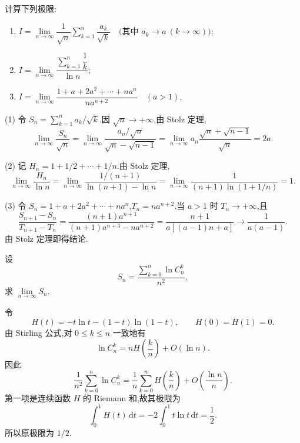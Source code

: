 \begin{example}
  计算下列极限:
  \begin{enumerate}
    \item $\displaystyle
            I=\lim\limits_{n\to\infty}\dfrac{1}{\sqrt n}\sum\limits_{k=1}^n\dfrac{a_k}{\sqrt k}
            \quad\text{(其中 }a_k\to a\ (k\to\infty)\text{)}$;
    \item $\displaystyle
            I=\lim\limits_{n\to\infty}\dfrac{\sum\limits_{k=1}^n\dfrac{1}{k}}{\ln n}$;
    \item $\displaystyle
            I=\lim\limits_{n\to\infty}\dfrac{1+a+2a^2+\cdots+na^n}{na^{n+2}}
            \quad(a>1)$.
  \end{enumerate}
\end{example}
\exampleblank

\begin{solution}
  (1) 令 $S_n=\displaystyle \sum\limits_{k=1}^n a_k/\sqrt k$.因 $\sqrt n\to+\infty$,由 Stolz 定理,
  \[
    \lim\limits_{n\to\infty}\dfrac{S_n}{\sqrt n}
    =\lim\limits_{n\to\infty}
    \dfrac{a_n/\sqrt n}{\sqrt n-\sqrt{n-1}}
    =\lim\limits_{n\to\infty}a_n\dfrac{\sqrt n+\sqrt{n-1}}{\sqrt n}=2a.
  \]

  (2) 记 $H_n=1+1/2+\cdots+1/n$.由 Stolz 定理,
  \[
    \lim\limits_{n\to\infty}\dfrac{H_n}{\ln n}
    =\lim\limits_{n\to\infty}
    \dfrac{1/(n+1)}{\ln(n+1)-\ln n}
    =\lim\limits_{n\to\infty}\dfrac{1}{(n+1)\ln(1+1/n)}=1.
  \]

  (3) 令 $S_n=1+a+2a^2+\cdots+na^n$,$T_n=na^{n+2}$.当 $a>1$ 时
  $T_n\to+\infty$,且
  \[
    \dfrac{S_{n+1}-S_n}{T_{n+1}-T_n}
    =\dfrac{(n+1)a^{n+1}}{(n+1)a^{n+3}-na^{n+2}}
    =\dfrac{n+1}{a[(a-1)n+a]}
    \longrightarrow\dfrac{1}{a(a-1)}.
  \]
  由 Stolz 定理即得结论.
\end{solution}

\begin{example}
  设
  \[
    S_n=\dfrac{\sum\limits_{k=0}^n\ln C_{n}^{k}}{n^2},
  \]
  求 $\displaystyle \lim\limits_{n\to\infty}S_n$.
\end{example}
\exampleblank

\begin{solution}
  令
  \[
    H(t)=-t\ln t-(1-t)\ln(1-t),
    \qquad H(0)=H(1)=0.
  \]
  由 Stirling 公式,对 $0\leq k\leq n$ 一致地有
  \[
    \ln C_n^k=nH\left(\dfrac{k}{n}\right)+O(\ln n).
  \]
  因此
  \[
    \dfrac{1}{n^2}\sum\limits_{k=0}^n\ln C_n^k
    =\dfrac{1}{n}\sum\limits_{k=0}^n H\left(\dfrac{k}{n}\right)
    +O\left(\dfrac{\ln n}{n}\right).
  \]
  第一项是连续函数 $H$ 的 Riemann 和,故其极限为
  \[
    \int_0^1H(t)\,\mathrm{d}t
    =-2\int_0^1t\ln t\,\mathrm{d}t
    =\dfrac{1}{2}.
  \]
  所以原极限为 $1/2$.
\end{solution}

